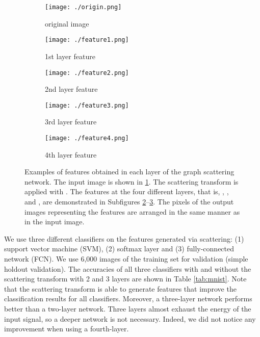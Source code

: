 \documentclass{article}
\begin{document}
\begin{figure}[!ht]
\centering
\begin{subfigure}{.19\textwidth}
	\centering
    \texttt{[image: ./origin.png]}
    \caption{original image}
    \label{fig:origin7}
\end{subfigure}
\begin{subfigure}{.19\textwidth}
	\centering
    \texttt{[image: ./feature1.png]}
    \caption{1st layer feature}
    \label{fig:scat71st}
\end{subfigure}
\begin{subfigure}{.19\textwidth}
	\centering
    \texttt{[image: ./feature2.png]}
    \caption{2nd layer feature}
\end{subfigure}
\begin{subfigure}{.19\textwidth}
	\centering
    \texttt{[image: ./feature3.png]}
    \caption{3rd layer feature}
\end{subfigure}
\begin{subfigure}{.19\textwidth}
	\centering
    \texttt{[image: ./feature4.png]}
    \caption{4th layer feature}
    \label{fig:scat74th}
\end{subfigure}
\caption{Examples of features obtained in each layer of the graph scattering network.
The input image  is shown in \ref{fig:origin7}. The scattering transform is applied with . The features at the four different layers{, that is, , ,  and ,} are demonstrated in Subfigures \ref{fig:scat71st}--\ref{fig:scat74th}.
The pixels of the output images representing the features are arranged in the same manner as in the input image.  
}
\label{fig:mnistFeatures}
\end{figure}

We use three different classifiers on the features generated via scattering: (1) support vector machine (SVM), (2) softmax layer and (3) fully-connected network (FCN). We use 6,000 images of the training set for validation (simple holdout validation). The accuracies of all three classifiers with and without the scattering transform with 2 and 3 layers are shown in Table \ref{tab:mnist}. Note that the scattering transform is able to generate features that improve the classification results for all classifiers. Moreover, a three-layer network performs better than a two-layer network. 
Three layers almost exhaust the energy of the input signal, so a deeper network is not necessary.
Indeed, we did not notice any improvement when using a fourth-layer.
\end{document}
